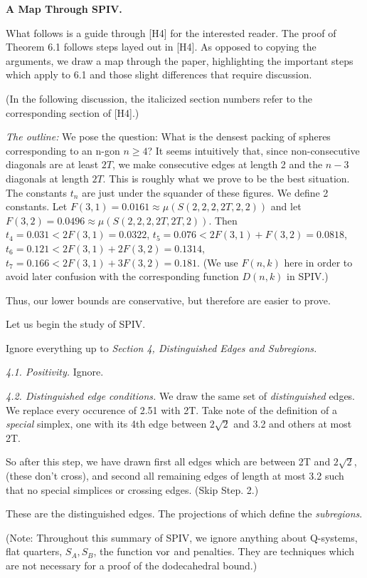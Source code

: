 \bigskip

{\bf A Map Through SPIV.}

What follows is a guide through [H4] for the interested reader.  
The proof of Theorem 6.1 follows steps layed out in [H4].  As opposed to
copying the arguments, we draw a map through the paper, highlighting the
important steps which apply to 6.1 and those slight differences that require 
discussion.

(In the following discussion, the italicized section numbers refer
to the corresponding section of [H4].)

{\it The outline:}  We pose the question: What is the densest packing of
spheres corresponding to an n-gon $n\ge 4$?  It seems intuitively that, since
non-consecutive diagonals are at least $2T$, we make consecutive edges at
length 2 and the $n-3$ diagonals at length $2T$.  This is roughly what we
prove to be the best situation.  The constants $t_n$ are just under the
squander of these figures.  We define 2 constants.  
Let $F(3,1)=0.0161\approx\mu(S(2,2,2,2T,2,2))$ and let 
$F(3,2)=0.0496\approx\mu(S(2,2,2,2T,2T,2)).$ 
Then $t_4=0.031<2F(3,1)=0.0322$, $t_5=0.076<2F(3,1)+F(3,2)=0.0818$, 
$t_6=0.121<2F(3,1)+2F(3,2)=0.1314$, $t_7=0.166<2F(3,1)+3F(3,2)=0.181$.
(We use $F(n,k)$ here in order to avoid later confusion with the
corresponding function $D(n,k)$ in SPIV.)


Thus, our lower bounds are conservative, but therefore are easier to prove.

Let us begin the study of SPIV.

Ignore everything up to {\it Section 4, Distinguished Edges and Subregions.}

{\it 4.1. Positivity.} Ignore. 

{\it 4.2. Distinguished edge conditions.}  We draw the same set of {\it
      distinguished} edges.  We replace every occurence of 2.51 with 2T.
      Take note of the definition of a {\it special} simplex, one with its 4th
      edge between $2\sqrt2$ and 3.2 and others at most 2T.
 
	So after this step, we have drawn first all edges which are between 2T
	and $2\sqrt2$, (these don't cross),  and second all remaining edges
	of length at most 3.2
	such that no special simplices or crossing edges. (Skip Step. 2.)

	These are the distinguished edges.  The projections of which define
 the {\it subregions}.

(Note: Throughout this summary of SPIV, we ignore anything about Q-systems, flat quarters,
$S_A,S_B$, the function $\operatorname{vor}$ and penalties.  They are techniques which are not necessary for a
proof of the dodecahedral bound.)

